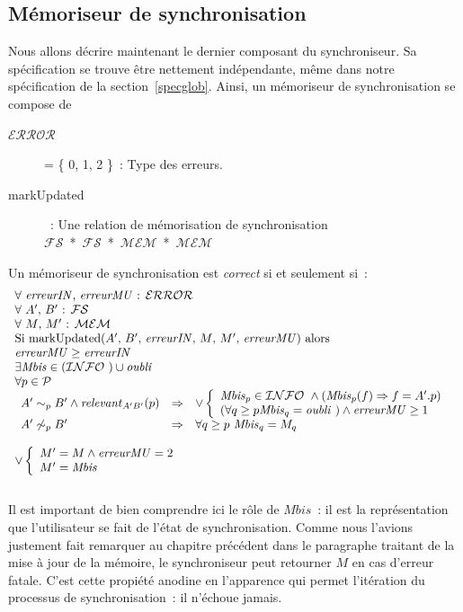\documentclass[11pt]{report}
\newcommand{\fs}{\ensuremath{\mathcal{FS}}}
\newcommand{\error}{\ensuremath{\mathcal{ERROR}}}
\newcommand{\mem}{\ensuremath{\mathcal{MEM}}}
\newcommand{\path}{\ensuremath{\mathcal{P}}}
\newcommand{\amnes}{\ensuremath{\mathit{oubli}}}
\newcommand{\ensemb}{\ensuremath{\mathcal{INFO}}}
\begin{document}
{\subsection{M\'emoriseur de synchronisation}
Nous allons d\'ecrire maintenant le dernier composant du synchroniseur.
Sa sp\'ecification se trouve \^etre nettement ind\'ependante, m\^eme dans 
notre sp\'ecification de la section~\ref{specglob}.
Ainsi, un m\'emoriseur de synchronisation se compose de
\begin{description}
\item [\error\ ] = \{ 0, 1, 2 \}~: Type des erreurs.
\item [markUpdated]~: Une relation de m\'emorisation de synchronisation\\
 \mbox{\fs\ * \fs\ * \mem\ * \mem\ }
\end{description}
Un m\'emoriseur de synchronisation est \emph{correct} si et seulement si~:
\[
\begin{array}{l}
\forall \mbox{\ $\mathit{erreurIN}$, $\mathit{erreurMU}$~: \error\ }\\
\forall \mbox{\ $A'$, $B'$~: \fs\ }\\
\forall \mbox{\ $M$, $M'$~: \mem\ }\\
\mbox{Si markUpdated($A'$, $B'$, $\mathit{erreurIN}$, $M$, $M'$, $\mathit{erreurMU}$) alors}\\
\mathit{erreurMU} \geq \mathit{erreurIN}\\
 \exists \mathit{Mbis} \in (\ensemb\ ) \cup \amnes\ \\
 \forall p \in \path\ \\
  \begin{array}{lll}
   A' \sim_{p} B' \wedge \mathit{relevant}_{A'B'}(p) &
   \Rightarrow & \vee 
    \left\{ 
     \begin{array}{l}
      \mathit{Mbis}_{p} \in \ensemb\ \wedge (\mathit{Mbis}_{p}(f) \Rightarrow f = A'.p)\\
      (\forall q \geq p \mathit{Mbis}_{q} = \amnes\ ) \wedge \mathit{erreurMU} \geq 1
     \end{array}
    \right. \\
    A' \not\sim_{p} B' & \Rightarrow & \forall q \geq p \mbox{\ } \mathit{Mbis}_{q} = M_{q} 
  \end{array}\\\\
\vee
 \left\{ 
  \begin{array}{ll}
   M' = M \wedge \mathit{erreurMU} = 2 \\
   M' = \mathit{Mbis}
  \end{array}
 \right.\\
\end{array}
\]\\
Il est important de bien comprendre ici le r\^ole de $\mathit{Mbis}$~: il est la repr\'esentation
que l'utilisateur se fait de l'\'etat de synchronisation. Comme nous l'avions justement
fait remarquer au chapitre pr\'ec\'edent dans le paragraphe traitant de la mise \`a jour
de la m\'emoire, le synchroniseur peut retourner $M$ en cas d'erreur
fatale. C'est cette propi\'et\'e anodine en l'apparence qui permet
l'it\'eration du processus de synchronisation~: il n'\'echoue jamais.\\
}
\end{document}
